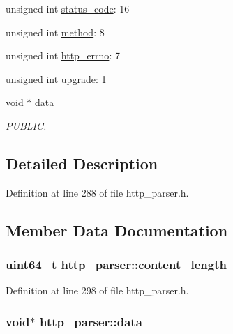 \begin{DoxyCompactItemize}
\item 
unsigned int \hyperlink{structhttp__parser_a82f5aed92ca3566489def7bc384bab26}{status\-\_\-code}\-: 16
\item 
unsigned int \hyperlink{structhttp__parser_a7955de339fafd81ad54380845913457d}{method}\-: 8
\item 
unsigned int \hyperlink{structhttp__parser_ab8638d65fa174bc1925d77e2533117fa}{http\-\_\-errno}\-: 7
\item 
unsigned int \hyperlink{structhttp__parser_a748f476eacc5ac56b84dd07dbafb42a4}{upgrade}\-: 1
\item 
void $\ast$ \hyperlink{structhttp__parser_a7e87ce57b97f60f1fdb7039a8ecb0bca}{data}
\begin{DoxyCompactList}\small\item\em P\-U\-B\-L\-I\-C. \end{DoxyCompactList}\end{DoxyCompactItemize}


\subsection{Detailed Description}


Definition at line 288 of file http\-\_\-parser.\-h.



\subsection{Member Data Documentation}
\hypertarget{structhttp__parser_a7fd5a194802b1206bb773e096d291f29}{
\subsubsection[{content\-\_\-length}]{\setlength{\rightskip}{0pt plus 5cm}uint64\-\_\-t http\-\_\-parser\-::content\-\_\-length}}\label{structhttp__parser_a7fd5a194802b1206bb773e096d291f29}


Definition at line 298 of file http\-\_\-parser.\-h.

\hypertarget{structhttp__parser_a7e87ce57b97f60f1fdb7039a8ecb0bca}{
\subsubsection[{data}]{\setlength{\rightskip}{0pt plus 5cm}void$\ast$ http\-\_\-parser\-::data}}\label{structhttp__parser_a7e87ce57b97f60f1fdb7039a8ecb0bca}


